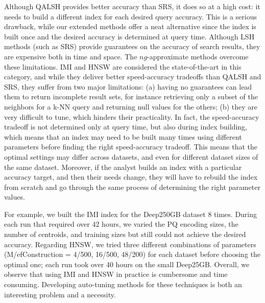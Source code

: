 {%
{\color{black} Although QALSH provides better accuracy than SRS, it does so at a high cost: it needs to build a different index for each desired query accuracy. This is a serious drawback, while our extended methods offer a neat alternative since the index is built once and the desired accuracy is determined at query time.} Although LSH methods (such as SRS) provide guarantees on the accuracy of search results, they are expensive both in time and space. The $ng$-approximate methods overcome these limitations. IMI and HNSW are considered the state-of-the-art in this category, and while they deliver better speed-accuracy tradeoffs than QALSH and SRS, they suffer from two major limitations: (a) having no guarantees can lead them to return incomplete result sets, for instance retrieving only a subset of the neighbors for a k-NN query and returning null values for the others; (b) they are very difficult to tune, which hinders their practicality. 
In fact, the speed-accuracy tradeoff is not determined only at query time, but also during index building, which means that an index may need to be built many times using different parameters before finding the right speed-accuracy tradeoff. 
This means that the optimal settings may differ across datasets, and even for different dataset sizes of the same dataset. 
Moreover, if the analyst builds an index with a particular accuracy target, and then their needs change, they will have to rebuild the index from scratch and go through the same process of determining the right parameter values.

For example, we built the IMI index for the Deep250GB dataset 8 times. 
During each run that required over 42 hours, we varied the PQ encoding sizes, the number of centroids, and training sizes but still could not achieve the desired accuracy. 
Regarding HNSW, we tried three different combinations of parameters (M/efConstruction = 4/500, 16/500, 48/200) for each dataset before choosing the optimal one; each run took over 40 hours on the small  Deep25GB.
Overall, we observe that using IMI and HNSW in practice is cumbersome and time consuming. 
Developing auto-tuning methods for these techniques is both an interesting problem and a necessity.

}
